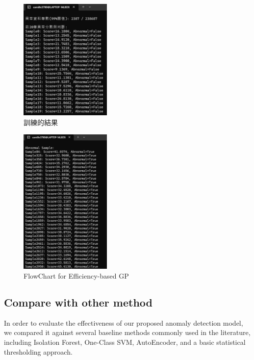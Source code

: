 \begin{ZhChapter}
    \begin{figure}[htbp]
        \centering
        \includegraphics[width = 0.4\textwidth]{image/NormalSample.jpg}
        \caption{訓練的結果}
        \label{fig:NS}
    \end{figure}


    \begin{figure}[htbp]
        \centering
        \includegraphics[width = 0.4\textwidth]{image/AbnormalSample.jpg}
        \caption{FlowChart for Efficiency-based GP}
        \label{fig:AS}
    \end{figure}




    \newpage
    \subsection{Compare with other method}
    In order to evaluate the effectiveness of our proposed anomaly detection model, we compared it against several baseline methods commonly used in the literature, including Isolation Forest, One-Class SVM, AutoEncoder, and a basic statistical thresholding approach.


\end{ZhChapter}
